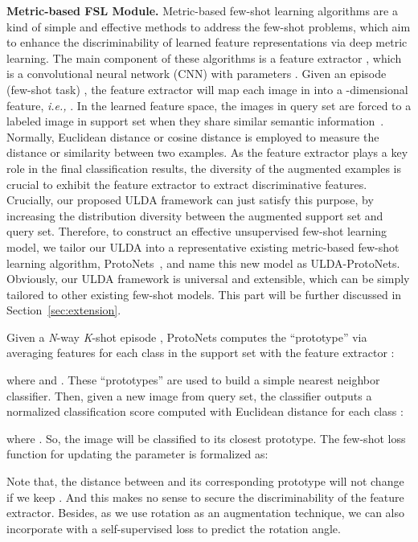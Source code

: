 \documentclass[letterpaper]{article} \usepackage{aaai21}  \usepackage{times}  \usepackage{helvet} \usepackage{courier}  \usepackage[hyphens]{url}  \usepackage{graphicx} \urlstyle{rm} \def\UrlFont{\rm}  \usepackage{natbib}  \usepackage{caption} \usepackage{url}
\begin{document}
\noindent\textbf{Metric-based FSL Module.}
Metric-based few-shot learning algorithms are a kind of simple and effective methods to address the few-shot problems, which aim to enhance the discriminability of learned feature representations via deep metric learning. The main component of these algorithms is a feature extractor , which is a convolutional neural network (CNN) with parameters . Given an episode (few-shot task) , the feature extractor will map each image  in  into a -dimensional feature, \textit{i.e.,} . In the learned feature space, the images in query set are forced to a labeled image in support set when they share similar semantic information~\cite{Sung2018CVPR,Li2019DN4}. Normally, Euclidean distance or cosine distance is employed to measure the distance or similarity between two examples. As the feature extractor plays a key role in the final classification results, the diversity of the augmented examples is crucial to exhibit the feature extractor to extract discriminative features. Crucially, our proposed ULDA framework can just satisfy this purpose, by increasing the distribution diversity between the augmented support set and query set. Therefore, to construct an effective unsupervised few-shot learning model, we tailor our ULDA into a representative existing metric-based few-shot learning algorithm, ProtoNets~\cite{Snell2016NIPS}, and name this new model as ULDA-ProtoNets. Obviously, our ULDA framework is universal and extensible, which can be simply tailored to other existing few-shot models. This part will be further discussed in Section~\ref{sec:extension}.






Given a \emph{N}-way \emph{K}-shot episode , ProtoNets computes the ``prototype'' via averaging features for each class in the support set with the feature extractor :

where  and . These ``prototypes'' are used to build a simple nearest neighbor classifier. Then, given a new image  from query set, the classifier outputs a normalized classification score computed with Euclidean distance for each class :

where . So, the image  will be classified to its closest prototype. The few-shot loss function  for updating the parameter  is formalized as:



Note that, the distance between  and its corresponding prototype will not change if we keep . And this makes no sense to secure the discriminability of the feature extractor. Besides, as we use rotation as an augmentation technique, we can also incorporate with a self-supervised loss  to predict the rotation angle. 
\end{document}
